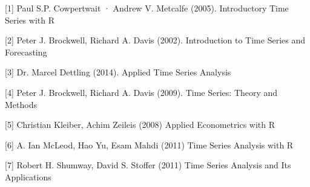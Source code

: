 \documentclass[11pt]{article}
\begin{document}
{[}1{]} Paul S.P. Cowpertwait · Andrew V. Metcalfe (2005). Introductory
Time Series with R

{[}2{]} Peter J. Brockwell, Richard A. Davis (2002). Introduction to
Time Series and Forecasting

{[}3{]} Dr. Marcel Dettling (2014). Applied Time Series Analysis

{[}4{]} Peter J. Brockwell, Richard A. Davis (2009). Time Series: Theory
and Methods

{[}5{]} Christian Kleiber, Achim Zeileis (2008) Applied Econometrics
with R

{[}6{]} A. Ian McLeod, Hao Yu, Esam Mahdi (2011) Time Series Analysis
with R

{[}7{]} Robert H. Shumway, David S. Stoffer (2011) Time Series Analysis
and Its Applications


    
    
    
    
\end{document}
